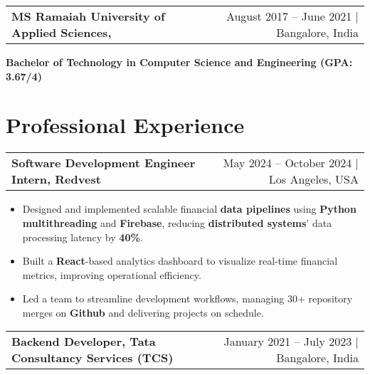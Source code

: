 \documentclass[10pt, legalpaper]{article}
\newenvironment{highlights}{
    \begin{itemize}[
        topsep=0.10 cm,
        parsep=0.10 cm,
        partopsep=0pt,
        itemsep=0pt,
        leftmargin=0 cm + 10pt
    ]
}{
    \end{itemize}
}
\newenvironment{onecolentry}{
    \par\noindent
}{
    \par
}
\begin{document}
\vspace{0.1 cm}


\begin{tabularx}{\textwidth}{@{}Xr@{}}
    \textbf{MS Ramaiah University of Applied Sciences,} & August 2017 – June 2021 | Bangalore, India \\
\end{tabularx}
\vspace{-4.5mm}
\begin{onecolentry}

\textbf{Bachelor of Technology in Computer Science and Engineering (GPA: 3.67/4)}
\end{onecolentry}

\section{Professional Experience}

\begin{tabularx}{\textwidth}{@{}Xr@{}}
    \textbf{Software Development Engineer Intern, Redvest} & May 2024 – October 2024 | Los Angeles, USA \\
\end{tabularx}
\vspace{-5mm}

\begin{onecolentry}
    \begin{highlights}
        \item Designed and implemented scalable financial \textbf{data pipelines} using \textbf{Python multithreading} and \textbf{Firebase}, reducing \textbf{distributed systems}' data processing latency by \textbf{40\%}.
        \item Built a \textbf{React}-based analytics dashboard to visualize real-time financial metrics, improving operational efficiency.
        \item Led a team to streamline development workflows, managing 30+ repository merges on \textbf{Github} and delivering projects on schedule.
    \end{highlights}
\end{onecolentry}

\vspace{0.0 cm}


\begin{tabularx}{\textwidth}{@{}Xr@{}}
    \textbf{Backend Developer, Tata Consultancy Services (TCS)} & January 2021 – July 2023 | Bangalore, India \\
\end{tabularx}
\vspace{-4.0mm}
\end{document}
